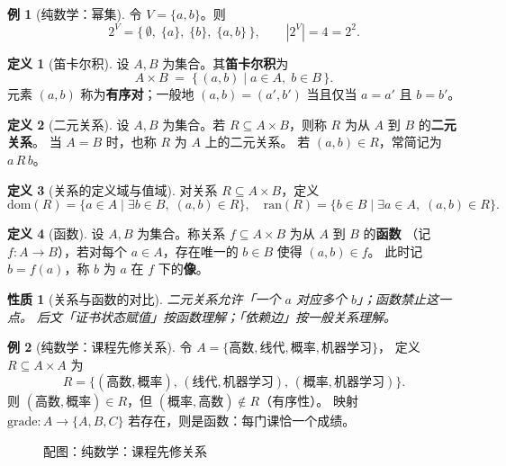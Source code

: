 \documentclass[UTF8,a4paper,11pt]{ctexart}
\theoremstyle{definition}
\newtheorem{definition}{定义}[section]
\newtheorem{example}{例}[section]
\theoremstyle{plain}
\newtheorem{property}{性质}[section]
\theoremstyle{remark}
\numberwithin{figure}{section}
\numberwithin{table}{section}
\begin{document}
\begin{example}[纯数学：幂集]
令 $V=\{a,b\}$。则
\[
2^{V}
=\bigl\{\,\emptyset,\;\{a\},\;\{b\},\;\{a,b\}\,\bigr\},
\qquad |2^{V}|=4=2^{2}.
\]
\end{example}

\begin{definition}[笛卡尔积]
设 $A,B$ 为集合。其\textbf{笛卡尔积}为
\[
A\times B \;=\; \{\,(a,b)\mid a\in A,\; b\in B\,\}.
\]
元素 $(a,b)$ 称为\textbf{有序对}；一般地 $(a,b)=(a',b')$ 当且仅当 $a=a'$ 且 $b=b'$。
\end{definition}

\begin{definition}[二元关系]
设 $A,B$ 为集合。若 $R\subseteq A\times B$，则称 $R$ 为从 $A$ 到 $B$ 的\textbf{二元关系}。
当 $A=B$ 时，也称 $R$ 为 $A$ 上的二元关系。
若 $(a,b)\in R$，常简记为 $a\,R\,b$。
\end{definition}

\begin{definition}[关系的定义域与值域]
对关系 $R\subseteq A\times B$，定义
\[
\mathrm{dom}(R)=\{a\in A\mid \exists b\in B,\;(a,b)\in R\},
\quad
\mathrm{ran}(R)=\{b\in B\mid \exists a\in A,\;(a,b)\in R\}.
\]
\end{definition}

\begin{definition}[函数]
设 $A,B$ 为集合。称关系 $f\subseteq A\times B$ 为从 $A$ 到 $B$ 的\textbf{函数}
（记 $f:A\to B$），若对每个 $a\in A$，存在唯一的 $b\in B$ 使得 $(a,b)\in f$。
此时记 $b=f(a)$，称 $b$ 为 $a$ 在 $f$ 下的\textbf{像}。
\end{definition}

\begin{property}[关系与函数的对比]
二元关系允许「一个 $a$ 对应多个 $b$」；函数禁止这一点。
后文「证书状态赋值」按函数理解；「依赖边」按一般关系理解。
\end{property}

\begin{example}[纯数学：课程先修关系]
令 $A=\{\text{高数},\text{线代},\text{概率},\text{机器学习}\}$，
定义 $R\subseteq A\times A$ 为
\[
R=\{(\text{高数},\text{概率}),\,(\text{线代},\text{机器学习}),\,(\text{概率},\text{机器学习})\}.
\]
则 $(\text{高数},\text{概率})\in R$，但 $(\text{概率},\text{高数})\notin R$（有序性）。
映射 $\mathrm{grade}:A\to\{A,B,C\}$ 若存在，则是函数：每门课恰一个成绩。
\begin{figure}[H]
\centering
{}
\caption{配图：纯数学：课程先修关系}
\label{fig:auto-01}
\end{figure}
\end{example}
\end{document}
